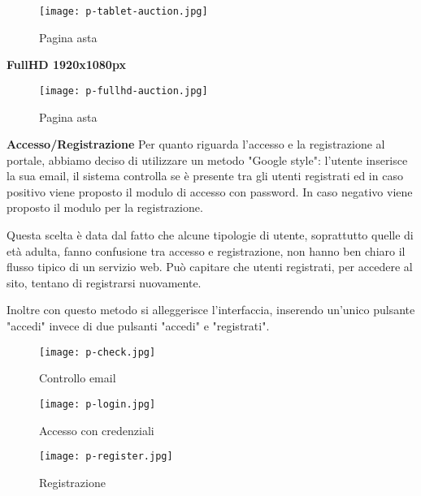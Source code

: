\begin{figure}[H]
	\centering
	\texttt{[image: p-tablet-auction.jpg]}
	\caption{Pagina asta}
	\label{fig:pTabletAuction}
\end{figure}

\clearpage

\bigbreak
\noindent
\textbf{FullHD 1920x1080px}

\begin{figure}[H]
	\centering
	\texttt{[image: p-fullhd-auction.jpg]}
	\caption{Pagina asta}
	\label{fig:pFullhdAuction}
\end{figure}

\clearpage

\bigbreak
\noindent
\textbf{Accesso/Registrazione}
\bigbreak
\noindent
Per quanto riguarda l'accesso e la registrazione al portale, abbiamo deciso di utilizzare un metodo "Google style": 
l'utente inserisce la sua email, il sistema controlla se è presente tra gli utenti registrati 
ed in caso positivo viene proposto il modulo di accesso con password.
In caso negativo viene proposto il modulo per la registrazione.

Questa scelta è data dal fatto che alcune tipologie di utente, soprattutto quelle di età adulta,
fanno confusione tra accesso e registrazione, non hanno ben chiaro il flusso tipico di un servizio web.
Può capitare che utenti registrati, per accedere al sito, tentano di registrarsi nuovamente.

Inoltre con questo metodo si alleggerisce l'interfaccia, inserendo un'unico pulsante "accedi" invece di due pulsanti "accedi" e "registrati".

\begin{figure}[H]
	\centering
	\texttt{[image: p-check.jpg]}
	\caption{Controllo email}
	\label{fig:pCheck}
\end{figure}

\begin{figure}[H]
	\centering
	\texttt{[image: p-login.jpg]}
	\caption{Accesso con credenziali}
	\label{fig:pLogin}
\end{figure}

\begin{figure}[H]
	\centering
	\texttt{[image: p-register.jpg]}
	\caption{Registrazione}
	\label{fig:pRegister}
\end{figure}
